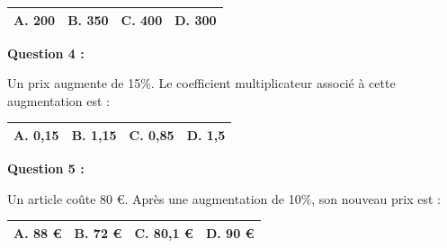 \documentclass[12pt,a4paper]{article}
\begin{document}
\renewcommand{\arraystretch}{3}
\begin{tabular}{|m{3.4cm}|m{3.4cm}|m{3.4cm}|m{3.4cm}|}
\hline
\centering \vspace{-0.3cm} \textbf{A.} 200 & 
\centering \vspace{-0.3cm} \textbf{B.} 350 & 
\centering \vspace{-0.3cm} \textbf{C.} 400 & 
\centering \vspace{-0.3cm} \textbf{D.} 300 \tabularnewline
\hline
\end{tabular}

\vspace{0.7cm}

\textbf{Question 4 :}
\vspace{5pt}

Un prix augmente de 15\%. Le coefficient multiplicateur associé à cette augmentation 
est :

\vspace{0.3cm}

\renewcommand{\arraystretch}{3}
\begin{tabular}{|m{3.4cm}|m{3.4cm}|m{3.4cm}|m{3.4cm}|}
\hline
\centering \vspace{-0.3cm} \textbf{A.} 0,15 & 
\centering \vspace{-0.3cm} \textbf{B.} 1,15 & 
\centering \vspace{-0.3cm} \textbf{C.} 0,85 & 
\centering \vspace{-0.3cm} \textbf{D.} 1,5 \tabularnewline
\hline
\end{tabular}

\vspace{0.7cm}

\textbf{Question 5 :}
\vspace{5pt}

Un article coûte 80 €. Après une augmentation de 10\%, son nouveau prix est :
\vspace{0.3cm}

\renewcommand{\arraystretch}{3}
\begin{tabular}{|m{3.4cm}|m{3.4cm}|m{3.4cm}|m{3.4cm}|}
\hline
\centering \vspace{-0.3cm} \textbf{A.} 88 € & 
\centering \vspace{-0.3cm} \textbf{B.} 72 € & 
\centering \vspace{-0.3cm} \textbf{C.} 80,1 € & 
\centering \vspace{-0.3cm} \textbf{D.} 90 € \tabularnewline
\hline
\end{tabular}
\end{document}
